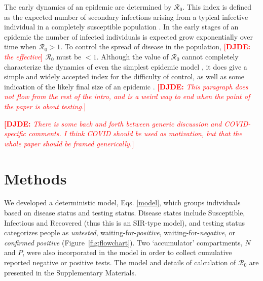 \documentclass[12pt]{article}
\newcommand{\Rnum}{\mathcal{R}_0}
\newcommand{\comment}{\showcomment}
\newcommand{\showcomment}[3]{\textcolor{#1}{\textbf{[#2: }\textsl{#3}\textbf{]}}}
\newcommand{\david}[1]{\comment{red}{DJDE}{#1}}
\theoremstyle{definition} %
\begin{document}
The early dynamics of an epidemic are determined by $\Rnum$. This index is defined as the expected number of secondary infections arising from a typical infective individual in a completely susceptible population \citep{dietz1993estimation}. 
In the early stages of an epidemic the number of infected individuals is expected grow exponentially over time when $\Rnum>1$. 
To control the spread of disease in the population, \david{the effective} $\Rnum$ must be $<1$.
Although the value of $\Rnum$ cannot completely characterize the dynamics of even the simplest epidemic model
\citep{shaw2021what}, it does give a simple and widely accepted index for the difficulty of control, as well as some indication of the likely final size of an epidemic \citep{ma2006generality}.
\david{This paragraph does not flow from the rest of the intro, and is a weird way to end when the point of the paper is about testing.}

\david{There is some back and forth between generic discussion and COVID-specific comments.  I think COVID should be used as motivation, but that the whole paper should be framed generically.}

\section{Methods}

We developed a deterministic model, Eqs. \eqref{model}, which groups individuals based on disease status and testing status. Disease states include Susceptible, Infectious and Recovered (thus this is an SIR-type model), and testing status categorizes people as \emph{untested}, waiting-for-\emph{positive}, waiting-for-\emph{negative}, or \emph{confirmed positive} (Figure~\ref{fig:flowchart}). Two `accumulator' compartments, $N$ and $P$, were also incorporated in the model in order to collect cumulative reported negative or positive tests. The model and details of calculation of $\Rnum$ are presented in the Supplementary Materials.
\end{document}
